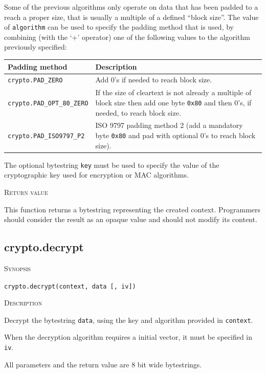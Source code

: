 \documentclass[11pt]{report}
\newcommand{\mansection}[1]{\vspace{0.5em}\par\noindent\textsc{#1}\vspace{0.5em}\par}
\newcommand{\syn}[1]{\texttt{#1}}
\begin{document}
  Some of the previous algorithms only operate on data that has been padded
  to a reach a proper size, that is usually a multiple of a defined ``block size''.
  The value of \syn{algorithm} can be used to specify the padding method that is used, 
  by combining (with the `+' operator) one of the following values to the algorithm 
  previously specified:

  \vspace{2em}
  \begin{tabular}{|l|p{8cm}|}
  \hline
  \textbf{Padding method}           & \textbf{Description} \\
  \hline
  \hline
  \syn{crypto.PAD\_ZERO}            & Add 0's if needed to reach block size. \\
  \hline
  \syn{crypto.PAD\_OPT\_80\_ZERO}   & If the size of cleartext is not already a multiple of block size then
                                      add one byte \texttt{0x80} and then 0's, if needed, to reach block 
                                      size. \\
  \hline
  \syn{crypto.PAD\_ISO9797\_P2}     & ISO 9797 padding method 2 (add a mandatory byte \texttt{0x80} and 
                                      pad with optional 0's to reach block size). \\
  \hline
  \end{tabular}
  \vspace{2em}

  The optional bytestring \syn{key} must be used to specify the value of the cryptographic key used for 
  encryption or MAC algorithms. 

\mansection{Return value}
  This function returns a bytestring representing the created context. Programmers should consider the 
  result as an opaque value and should not modify its content. 

\subsection{crypto.decrypt}

\mansection{Synopsis}
\syn{crypto.decrypt(context, data [, iv])}

\mansection{Description}
Decrypt the bytestring \syn{data}, using the key and algorithm provided in \syn{context}. 

When the decryption algorithm requires a initial vector, it must be specified in \syn{iv}.

All parameters and the return value are 8 bit wide bytestrings.
\end{document}
